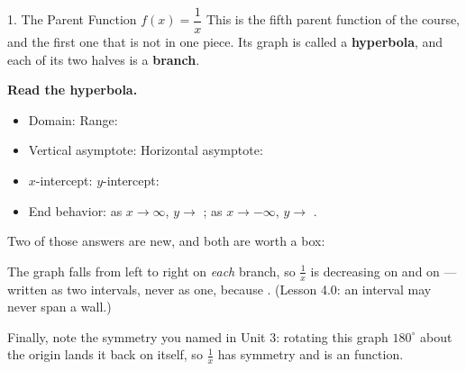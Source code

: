 \documentclass[10pt]{article}
\newcommand{\lgrid}[4]{%
  \draw[step=1, linegray!40, very thin] (#1,#3) grid (#2,#4);
  \draw[->, semithick, charcoal] (#1,0)--(#2,0) node[below right, font=\scriptsize]{$x$};
  \draw[->, semithick, charcoal] (0,#3)--(0,#4) node[left, font=\scriptsize]{$y$};}
\begin{document}
\begin{notesbox}{1. The Parent Function $f(x)=\dfrac{1}{x}$}
This is the fifth parent function of the course, and the first one that is not in one piece. Its graph is
called a \textbf{hyperbola}, and each of its two halves is a \textbf{branch}.
\begin{center}
\end{center}
\textbf{Read the hyperbola.}
\begin{itemize}[leftmargin=1.5em, itemsep=3pt]
  \item Domain:  \quad Range: 
  \item Vertical asymptote:  \quad Horizontal asymptote: 
  \item $x$-intercept:  \quad $y$-intercept: 
  \item End behavior: as $x\to\infty$, $y\to$ ; \; as $x\to-\infty$, $y\to$ .
\end{itemize}

\vspace{3pt}
Two of those answers are new, and both are worth a box:

\begin{center}
\end{center}

\vspace{3pt}
The graph falls from left to right on \emph{each} branch, so $\frac1x$ is decreasing on
 and on  --- written as two intervals, never as one, because
 . (Lesson 4.0: an interval may never span a wall.)

\vspace{3pt}
Finally, note the symmetry you named in Unit 3: rotating this graph $180^\circ$ about the origin lands
it back on itself, so $\frac1x$ has  symmetry and is an  function.
\end{notesbox}
\end{document}
